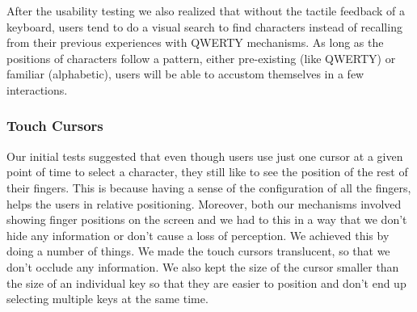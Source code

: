 After the usability testing we also realized that without the tactile
feedback of a keyboard, users tend to do a visual search to find
characters instead of recalling from their previous experiences with
QWERTY mechanisms. As long as the positions of characters follow a
pattern, either pre-existing (like QWERTY) or familiar (alphabetic),
users will be able to accustom themselves in a few interactions.

\subsubsection{Touch Cursors}

Our initial tests suggested that even though users use just one cursor at a given point of time to select a character, they still like to see the position of the rest of their fingers. This is because having a sense of the configuration of all the fingers, helps the users in relative positioning. Moreover, both our mechanisms involved showing finger positions on the screen and we had to this in a way that we don't hide any information or don't cause a loss of perception. We achieved this by doing a number of things. We made the touch cursors translucent, so that we don't occlude any information. We also kept the size of the cursor smaller than the size of an individual key so that they are easier to position and don't end up selecting multiple keys at the same time. 